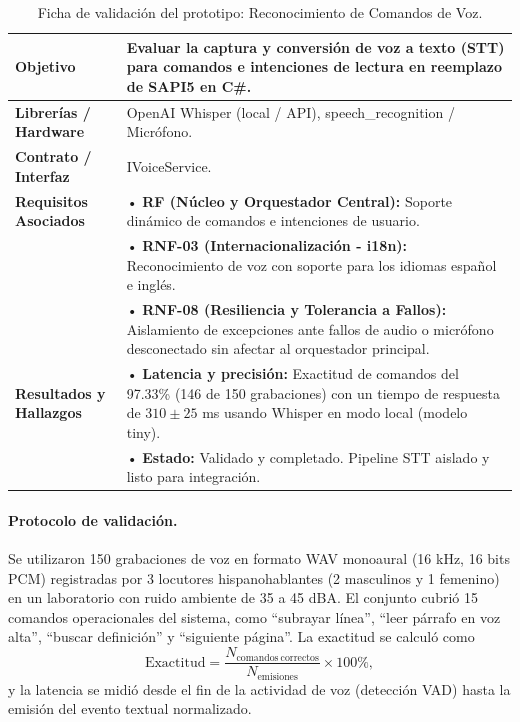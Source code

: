 \begin{table}[H]
    \centering
    \caption{Ficha de validación del prototipo: Reconocimiento de Comandos de Voz.}
    \label{tab:ficha_f24}
    \begin{tabular}{|L{3.2cm}|L{11.0cm}|}
        \hline
        \textbf{Objetivo} & Evaluar la captura y conversión de voz a texto (STT) para comandos e intenciones de lectura en reemplazo de SAPI5 en C\#. \\ \hline
        \textbf{Librerías / Hardware} & OpenAI Whisper (local / API), speech\_recognition / Micrófono. \\ \hline
        \textbf{Contrato / Interfaz} & IVoiceService. \\ \hline
        \textbf{Requisitos Asociados} &
        • \textbf{RF (Núcleo y Orquestador Central):} Soporte dinámico de comandos e intenciones de usuario. \vspace{0.1cm} \\
        & • \textbf{RNF-03 (Internacionalización - i18n):} Reconocimiento de voz con soporte para los idiomas español e inglés. \vspace{0.1cm} \\
        & • \textbf{RNF-08 (Resiliencia y Tolerancia a Fallos):} Aislamiento de excepciones ante fallos de audio o micrófono desconectado sin afectar al orquestador principal. \\ \hline
        \textbf{Resultados y Hallazgos} &
        • \textbf{Latencia y precisión:} Exactitud de comandos del 97.33\% (146 de 150 grabaciones) con un tiempo de respuesta de $310 \pm 25$ ms usando Whisper en modo local (modelo tiny). \vspace{0.1cm} \\
        & • \textbf{Estado:} Validado y completado. Pipeline STT aislado y listo para integración. \\ \hline
    \end{tabular}
\end{table}
 
\paragraph{Protocolo de validación.} Se utilizaron 150 grabaciones de voz en formato WAV monoaural (16 kHz, 16 bits PCM) registradas por 3 locutores hispanohablantes (2 masculinos y 1 femenino) en un laboratorio con ruido ambiente de 35 a 45 dBA. El conjunto cubrió 15 comandos operacionales del sistema, como ``subrayar línea'', ``leer párrafo en voz alta'', ``buscar definición'' y ``siguiente página''. La exactitud se calculó como
\[ \mathrm{Exactitud} = \frac{N_{\mathrm{comandos\ correctos}}}{N_{\mathrm{emisiones}}} \times 100\%, \]
y la latencia se midió desde el fin de la actividad de voz (detección VAD) hasta la emisión del evento textual normalizado.
 

